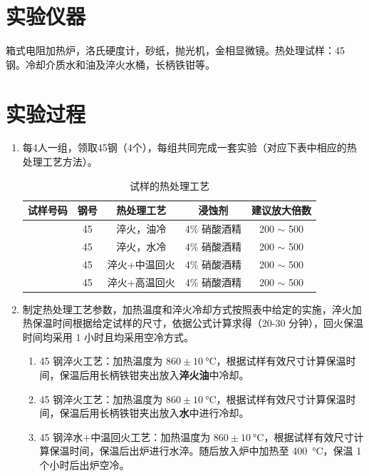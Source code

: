 \documentclass[a4paper,utf8]{article}
\begin{document}
\section{实验仪器}%
箱式电阻加热炉，洛氏硬度计，砂纸，抛光机，金相显微镜。热处理试样：45 钢。冷却介质水和油及淬火水桶，长柄铁钳等。
\section{实验过程}%
    \begin{enumerate}
        \item 每4人一组，领取45钢（4个），每组共同完成一套实验（对应下表中相应的热处理工艺方法）。
        \begin{table}[!ht]\centering
            \caption{试样的热处理工艺}
             \newcommand{\Sam}{\stepcounter{sample}\thesample}
            \begin{tabular}{|*{5}{c|}}\hline
                试样号码 & 钢号 & 热处理工艺 & 浸蚀剂 & 建议放大倍数 \\ \hline
                \Sam & 45 & 淬火，油冷 & 4\% 硝酸酒精 & 200 $\sim$ 500 \\ \hline
                \Sam & 45 & 淬火，水冷 & 4\% 硝酸酒精 & 200 $\sim$ 500 \\ \hline
                \Sam & 45 & 淬火+中温回火 & 4\% 硝酸酒精 & 200 $\sim$ 500 \\ \hline
                \Sam & 45 & 淬火+高温回火 & 4\% 硝酸酒精 & 200 $\sim$ 500 \\ \hline
            \end{tabular}
        \end{table}
        \item 制定热处理工艺参数，加热温度和淬火冷却方式按照表中给定的实施，淬火加热保温时间根据给定试样的尺寸，依据公式计算求得（20-30 分钟），回火保温时间均采用 1 小时且均采用空冷方式。
        \begin{enumerate}
            \item 45 钢淬火工艺：加热温度为 $860 \pm \SI{10}{\degreeCelsius}$，根据试样有效尺寸计算保温时间，保温后用长柄铁钳夹出放入\textbf{淬火油}中冷却。
            \item 45 钢淬火工艺：加热温度为 $860 \pm \SI{10}{\degreeCelsius}$，根据试样有效尺寸计算保温时间，保温后用长柄铁钳夹出放入\textbf{水}中进行冷却。
            \item 45 钢淬水+中温回火工艺：加热温度为 $860 \pm \SI{10}{\degreeCelsius}$，根据试样有效尺寸计算保温时间，保温后出炉进行水淬。随后放入炉中加热至 \SI{400}{\degreeCelsius}，保温 1 个小时后出炉空冷。

\end{enumerate}
\end{enumerate}
\end{document}
